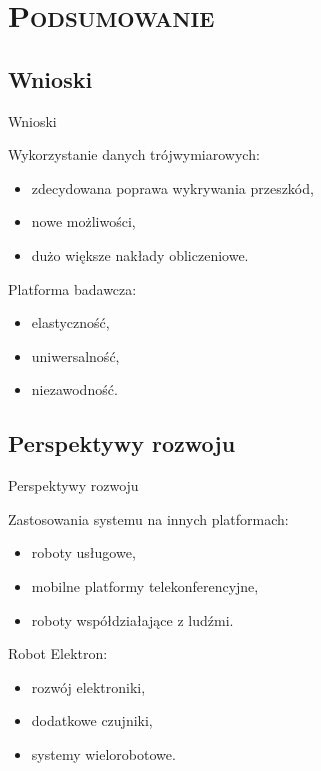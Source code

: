 \documentclass[xcolor=x11names,compress]{beamer}
\renewcommand{\(}{\begin{columns}}
\renewcommand{\)}{\end{columns}}
\newcommand{\<}[1]{\begin{column}{#1}}
\renewcommand{\>}{\end{column}}
\begin{document}
\section{\scshape Podsumowanie}

\subsection*{Wnioski}
\begin{frame}{Wnioski}

\alert{Wykorzystanie danych trójwymiarowych:}
\begin{itemize}
\item zdecydowana poprawa wykrywania przeszkód,
\item nowe możliwości,
\item dużo większe nakłady obliczeniowe.
\end{itemize}

\vspace{.7cm}

\alert{Platforma badawcza:}
\begin{itemize}
\item elastyczność,
\item uniwersalność,
\item niezawodność.
\end{itemize}

\end{frame}

\subsection*{Perspektywy rozwoju}
\begin{frame}{Perspektywy rozwoju}

\alert{Zastosowania systemu na innych platformach:}
\begin{itemize}
\item roboty usługowe,
\item mobilne platformy telekonferencyjne,
\item roboty współdziałające z ludźmi.
\end{itemize}

\vspace{.7cm}

\alert{Robot Elektron:}
\begin{itemize}
\item rozwój elektroniki,
\item dodatkowe czujniki,
\item systemy wielorobotowe.
\end{itemize}

\end{frame}
\end{document}
